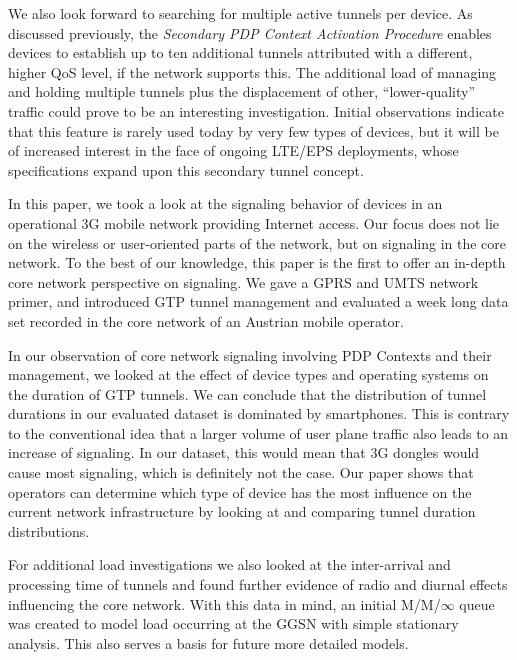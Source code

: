 We also look forward to searching for multiple active tunnels per device. As discussed previously, the \textit{Secondary PDP Context Activation Procedure} enables devices to establish up to ten additional tunnels attributed with a different, higher QoS level, if the network supports this. The additional load of managing and holding multiple tunnels plus the displacement of other, ``lower-quality'' traffic could prove to be an interesting investigation. Initial observations indicate that this feature is rarely used today by very few types of devices, but it will be of increased interest in the face of ongoing LTE/EPS deployments, whose specifications expand upon this secondary tunnel concept.




In this paper, we took a look at the signaling behavior of devices in an operational \ac{3G} mobile network providing Internet access. Our focus does not lie on the wireless or user-oriented parts of the network, but on signaling in the core network. To the best of our knowledge, this paper is the first to offer an in-depth core network perspective on signaling. We gave a \ac{GPRS} and \ac{UMTS} network primer, and introduced \ac{GTP} tunnel management and evaluated a week long data set recorded in the core network of an Austrian mobile operator.

In our observation of core network signaling involving \ac{PDP} Contexts and their management, we looked at the effect of device types and operating systems on the duration of \ac{GTP} tunnels. We can conclude that the distribution of tunnel durations in our evaluated dataset is dominated by smartphones. This is contrary to the conventional idea that a larger volume of user plane traffic also leads to an increase of signaling. In our dataset, this would mean that 3G dongles would cause most signaling, which is definitely not the case. Our paper shows that operators can determine which type of device has the most influence on the current network infrastructure by looking at and comparing tunnel duration distributions.

For additional load investigations we also looked at the inter-arrival and processing time of tunnels and found further evidence of radio and diurnal effects influencing the core network. With this data in mind, an initial M/M/$\infty$ queue was created to model load occurring at the \ac{GGSN} with simple stationary analysis. This also serves a basis for future more detailed models.

